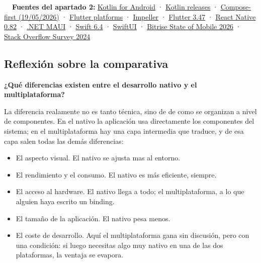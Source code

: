 \documentclass[11pt,a4paper]{article}
\newcommand{\campo}[1]{\textbf{\color{primary}#1}}
\begin{document}
	\begin{fuentesbox}
		\textbf{\color{muted}\faBook\ \ Fuentes del apartado 2:}
		\href{https://developer.android.com/kotlin/first}{Kotlin for Android} ·
		\href{https://kotlinlang.org/docs/releases.html}{Kotlin releases} ·
		\href{https://developer.android.com/blog/posts/android-ui-development-is-compose-first}{Compose-first (19/05/2026)} ·
		\href{https://docs.flutter.dev/reference/supported-platforms}{Flutter platforms} ·
		\href{https://docs.flutter.dev/perf/impeller}{Impeller} ·
		\href{https://docs.flutter.dev/release/whats-new}{Flutter 3.47} ·
		\href{https://reactnative.dev/blog/2025/10/08/react-native-0.82}{React Native 0.82} ·
		\href{https://learn.microsoft.com/dotnet/maui/what-is-maui}{.NET MAUI} ·
		\href{https://www.swift.org/blog/swift-6.4-released/}{Swift 6.4} ·
		\href{https://developer.apple.com/swiftui/}{SwiftUI} ·
		\href{https://bitrise.io/reports/state-of-mobile-development-2026}{Bitrise State of Mobile 2026} ·
		\href{https://survey.stackoverflow.co/2024/technology/}{Stack Overflow Survey 2024}
	\end{fuentesbox}
	
	\subsection{Reflexión sobre la comparativa}
	
	\campo{¿Qué diferencias existen entre el desarrollo nativo y el multiplataforma?}
	
	La diferencia realamente no es tanto técnica, sino de de como se organizan a nivel de componentes. En el nativo la aplicación usa directamente los componentes del sistema; en el multiplataforma hay una capa intermedia que traduce, y de esa capa salen todas las demás diferencias:
	\begin{itemize}[leftmargin=*,itemsep=0.2em,topsep=0.2em]
		\item El aspecto visual. El nativo se ajusta mas al entorno.
		\item El rendimiento y el consumo. El nativo es más eficiente, siempre.
		\item El acceso al hardware. El nativo llega a todo; el multiplataforma, a lo que alguien haya escrito un binding.
		\item El tamaño de la aplicación. El nativo pesa menos.
		\item El coste de desarrollo. Aquí el multiplataforma gana sin discusión, pero con una condición: si luego necesitas algo muy nativo en una de las dos plataformas, la ventaja se evapora.
	\end{itemize}
	
\end{document}
